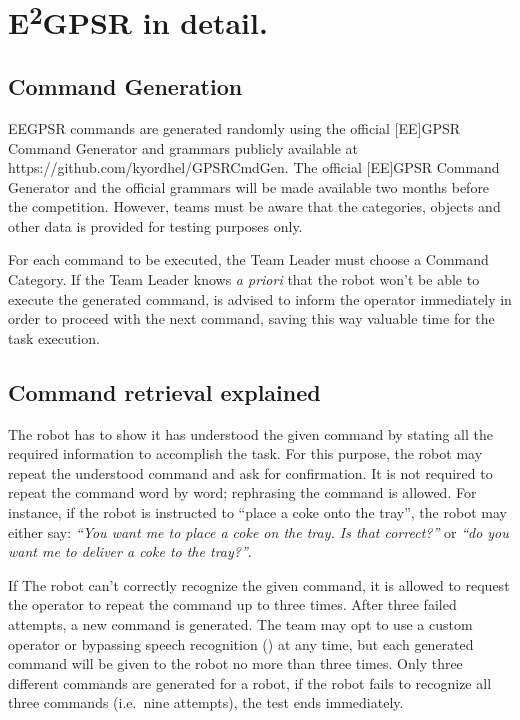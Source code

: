 \chapter[EEGPSR in detail]{E\textsuperscript{2}GPSR in detail.}
\label{chap:eegpsr-appendix}

\section{Command Generation}
EEGPSR commands are generated randomly using the official [EE]GPSR Command Generator and grammars publicly available at https://github.com/kyordhel/GPSRCmdGen. The official [EE]GPSR Command Generator and the official grammars will be made available two months before the competition. However, teams must be aware that the categories, objects and other data is provided for testing purposes only.

For each command to be executed, the Team Leader must choose a Command Category. If the Team Leader knows \textit{a priori} that the robot won't be able to execute the generated command, is advised to inform the operator immediately in order to proceed with the next command, saving this way valuable time for the task execution.


\section{Command retrieval explained}
The robot has to show it has understood the given command by stating all the required information to accomplish the task. For this purpose, the robot may repeat the understood command and ask for confirmation. It is not required to repeat the command word by word; rephrasing the command is allowed. For instance, if the robot is instructed to \enquote{place a coke onto the tray}, the robot may either say: \textit{\enquote{You want me to place a coke on the tray. Is that correct?}} or \textit{\enquote{do you want me to deliver a coke to the tray?}}.

If The robot can't correctly recognize the given command, it is allowed to request the operator to repeat the command up to three times. After three failed attempts, a new command is generated. The team may opt to use a custom operator or bypassing speech recognition () at any time, but each generated command will be given to the robot no more than three times. Only three different commands are generated for a robot, if the robot fails to recognize all three commands (i.e.~nine attempts), the test ends immediately.

